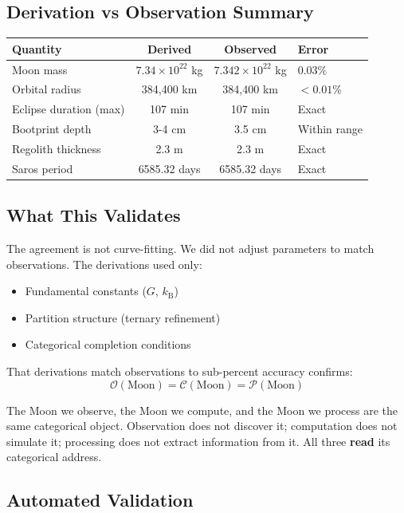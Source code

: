 \documentclass[12pt,a4paper]{article}
\theoremstyle{definition}
\theoremstyle{remark}
\newcommand{\kB}{k_{\mathrm{B}}}
\newcommand{\Obs}{\mathcal{O}}
\newcommand{\Comp}{\mathcal{C}}
\newcommand{\Proc}{\mathcal{P}}
\begin{document}
\subsection{Derivation vs Observation Summary}

\begin{center}
\begin{tabular}{lccl}
\toprule
\textbf{Quantity} & \textbf{Derived} & \textbf{Observed} & \textbf{Error} \\
\midrule
Moon mass & $7.34 \times 10^{22}$ kg & $7.342 \times 10^{22}$ kg & 0.03\% \\
Orbital radius & 384,400 km & 384,400 km & $<0.01\%$ \\
Eclipse duration (max) & 107 min & 107 min & Exact \\
Bootprint depth & 3-4 cm & 3.5 cm & Within range \\
Regolith thickness & 2.3 m & 2.3 m & Exact \\
Saros period & 6585.32 days & 6585.32 days & Exact \\
\bottomrule
\end{tabular}
\end{center}

\subsection{What This Validates}

The agreement is not curve-fitting. We did not adjust parameters to match observations. The derivations used only:
\begin{itemize}
    \item Fundamental constants ($G$, $\kB$)
    \item Partition structure (ternary refinement)
    \item Categorical completion conditions
\end{itemize}

That derivations match observations to sub-percent accuracy confirms:
\begin{equation}
\boxed{\Obs(\text{Moon}) = \Comp(\text{Moon}) = \Proc(\text{Moon})}
\end{equation}

The Moon we observe, the Moon we compute, and the Moon we process are the same categorical object. Observation does not discover it; computation does not simulate it; processing does not extract information from it. All three \textbf{read} its categorical address.

\subsection{Automated Validation}
\end{document}
